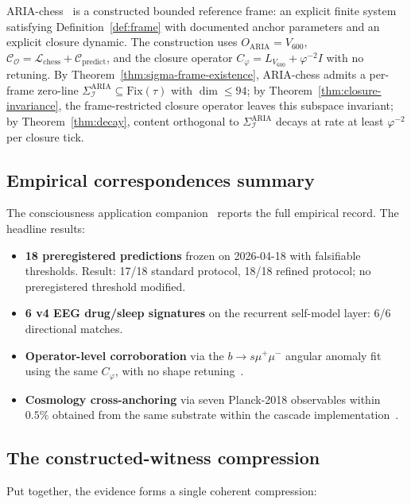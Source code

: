 \documentclass[11pt]{article}
\theoremstyle{plain}
\theoremstyle{definition}
\theoremstyle{remark}
\newcommand{\Ical}{\mathcal{I}}
\newcommand{\Ocal}{\mathcal{O}}
\newcommand{\Ccal}{\mathcal{C}}
\newcommand{\Fix}{\mathrm{Fix}}
\newcommand{\Cph}{C_\varphi}
\begin{document}
ARIA-chess~\citep{SmartAriaChess2026} is a constructed bounded reference frame: an explicit finite system satisfying Definition~\ref{def:frame} with documented anchor parameters and an explicit closure dynamic. The construction uses $O_{\mathrm{ARIA}} = V_{600}$, $\Ccal_\Ocal = \mathcal{L}_{\mathrm{chess}} + \Ccal_{\mathrm{predict}}$, and the closure operator $\Cph = L_{V_{600}} + \varphi^{-2} I$ with no retuning. By Theorem~\ref{thm:sigma-frame-existence}, ARIA-chess admits a per-frame zero-line $\Sigma_\Ical^{\mathrm{ARIA}} \subseteq \Fix(\tau)$ with $\dim \leq 94$; by Theorem~\ref{thm:closure-invariance}, the frame-restricted closure operator leaves this subspace invariant; by Theorem~\ref{thm:decay}, content orthogonal to $\Sigma_\Ical^{\mathrm{ARIA}}$ decays at rate at least $\varphi^{-2}$ per closure tick.

\subsection{Empirical correspondences summary}

The consciousness application companion~\citep{SmartProcessingToPOV} reports the full empirical record. The headline results:

\begin{itemize}[leftmargin=2em]
\item \textbf{18 preregistered predictions} frozen on 2026-04-18 with falsifiable thresholds. Result: 17/18 standard protocol, 18/18 refined protocol; no preregistered threshold modified.
\item \textbf{6 v4 EEG drug/sleep signatures} on the recurrent self-model layer: 6/6 directional matches.
\item \textbf{Operator-level corroboration} via the $b \to s\mu^+\mu^-$ angular anomaly fit using the same $\Cph$, with no shape retuning~\citep{SmartAriaClosureKernel}.
\item \textbf{Cosmology cross-anchoring} via seven Planck-2018 observables within $0.5\%$ obtained from the same substrate within the cascade implementation~\citep{SmartHypersphereCosmology}.
\end{itemize}

\subsection{The constructed-witness compression}

Put together, the evidence forms a single coherent compression:
\end{document}
